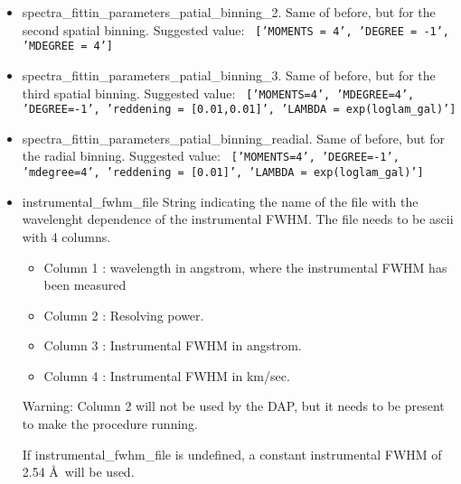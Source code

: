 \begin{itemize}
  \item spectra\_fittin\_parameters\_patial\_binning\_2. Same of
    before, but for the second spatial binning. Suggested value: {\tt
      ['MOMENTS = 4', 'DEGREE = -1', 'MDEGREE = 4']}

  \item spectra\_fittin\_parameters\_patial\_binning\_3.  Same of
    before, but for the third spatial binning. Suggested value: {\tt
      ['MOMENTS=4', 'MDEGREE=4', 'DEGREE=-1', 'reddening =
        [0.01,0.01]', 'LAMBDA = exp(loglam\_gal)']}

  \item spectra\_fittin\_parameters\_patial\_binning\_readial.  Same
    of before, but for the radial binning. Suggested value: {\tt
      ['MOMENTS=4', 'DEGREE=-1', 'mdegree=4', 'reddening = [0.01]',
        'LAMBDA = exp(loglam\_gal)']}

  \item instrumental\_fwhm\_file String indicating the name of the
    file with the wavelenght dependence of the instrumental FWHM. The
    file needs to be ascii with 4 columns.

  \begin{itemize}
     \item Column 1 : wavelength in angstrom, where the instrumental
       FWHM has been measured
     \item Column 2 : Resolving power.
     \item Column 3 : Instrumental FWHM in angstrom.
     \item Column 4 : Instrumental FWHM in km/sec.
  \end{itemize}

  Warning: Column 2 will not be used by the DAP, but it needs to be
  present to make the procedure running.

  If instrumental\_fwhm\_file is undefined, a constant instrumental
  FWHM of 2.54 \AA\ will be used.

\end{itemize}
